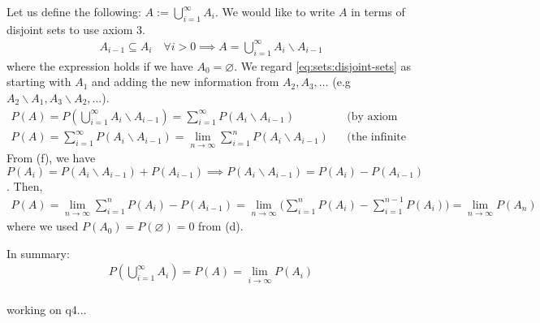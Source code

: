 \begin{enumerate}[label=\alph*.]
Let us define the following: $A := \bigcup_{i=1}^{\infty} A_{i}$. We would like to write $A$ in terms of disjoint sets to use axiom 3.
\begin{align}\label{eq:sets:disjoint-sets}
A_{i-1} \subseteq A_i \quad \forall i > 0 \implies A = \bigcup_{i=1}^{\infty} A_{i}\backslash A_{i-1}
\end{align}
where the expression holds if we have $A_{0} = \varnothing$. We regard \ref{eq:sets:disjoint-sets} as starting with $A_1$ and adding the new information from $A_2, A_3,\dots$ (e.g $A_2 \backslash A_1, A_3 \backslash A_2, \dots$). 
\begin{align}\label{eq:sets:axiom3-on-set}
P(A) = P\left(\bigcup_{i=1}^{\infty} A_{i}\backslash A_{i-1}\right) = \sum_{i=1}^\infty P(A_{i}\backslash A_{i-1})&&\text{(by axiom 3)}\\
P(A) = \sum_{i=1}^\infty P(A_{i}\backslash A_{i-1}) = \lim_{n\xrightarrow{}\infty} \sum_{i=1}^n P(A_{i}\backslash A_{i-1}) &&\text{(the infinite summation is a limit)}
\end{align}
From (f), we have $P(A_i) = P(A_{i}\backslash A_{i-1}) + P(A_{i-1}) \implies  P(A_{i}\backslash A_{i-1}) = P(A_i) - P(A_{i-1})$. Then,
\begin{align}
P(A) = \lim_{n\xrightarrow{}\infty} \sum_{i=1}^n P(A_i) - P(A_{i-1}) = \lim_{n\xrightarrow{}\infty} \bigg(\sum_{i=1}^n P(A_i) - \sum_{i=1}^{n-1} P(A_{i})\bigg) = \lim_{n\xrightarrow{}\infty} P(A_n)
\end{align}
where we used $P(A_0) = P(\varnothing) = 0$ from (d). 

In summary:
\begin{align}
P\left(\bigcup_{i=1}^{\infty} A_{i}\right) = P(A) = \lim_{i\xrightarrow{}\infty} P(A_i)
\end{align}

\end{enumerate}

\paragraph{}

working on q4...

